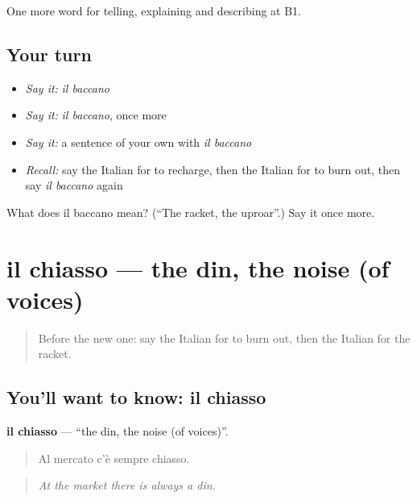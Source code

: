 \begin{grammarlens}[title={What you've built}]
One more word for telling, explaining and describing at B1.
\end{grammarlens}

\subsection*{Your turn}
\begin{itemize}
\raggedright
  \item \emph{Say it:} \emph{il baccano}
  \item \emph{Say it:} \emph{il baccano}, once more
  \item \emph{Say it:} a sentence of your own with \emph{il baccano}
  \item \emph{Recall:} say the Italian for to recharge, then the Italian for to burn out, then say \emph{il baccano} again
\end{itemize}

\begin{tcolorbox}[breakable,colback=teal!4,colframe=teal!35!black,title={Before you move on}]
What does il baccano mean? (\textquotedblleft{}The racket, the uproar\textquotedblright{}.) Say it once more.
\end{tcolorbox}
\section[il chiasso]{il chiasso — the din, the noise (of voices)}

\label{lesson:IT-C437-chiasso}



\begin{quote}
Before the new one: say the Italian for to burn out, then the Italian for the racket.
\end{quote}

\subsection*{You'll want to know: il chiasso}
\textbf{il chiasso} — \textquotedblleft{}the din, the noise (of voices)\textquotedblright{}.

\begin{quote}
Al mercato c'è sempre chiasso.
\end{quote}

\begin{quote}
\emph{At the market there is always a din.}
\end{quote}

